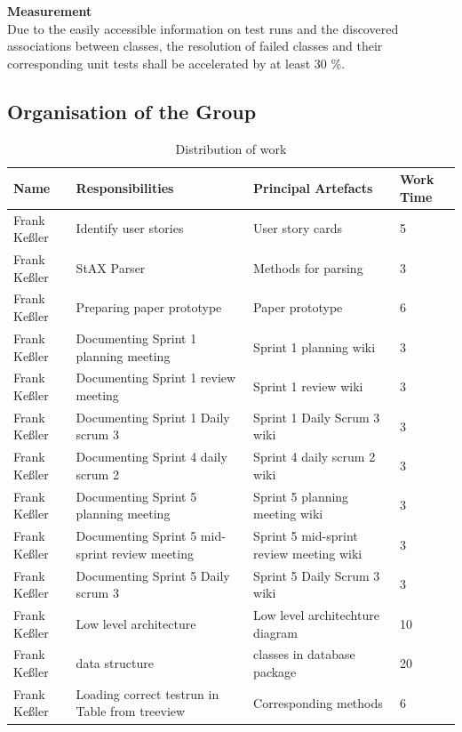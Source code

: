{\large\textbf{Measurement}}\\ 
Due to the easily accessible information on test runs and the discovered associations between classes, the resolution of failed classes and their corresponding unit tests shall be accelerated by at least 30 \%. 

\newpage
\subsection{Organisation of the Group}
\begin{table}[!h]
  \caption{Distribution of work}
  \centering
  \begin{tabular}{p{2cm}||p{4.2cm}|p{4cm}|l|}
    Name & Responsibilities & Principal Artefacts & Work Time\\
    \hline
    \hline
    Frank Keßler & Identify user stories & User story cards & 5 \\
    \hline
    Frank Keßler & StAX Parser & Methods for parsing & 3 \\ 
    \hline
    Frank Keßler & Preparing paper prototype & Paper prototype & 6 \\ 
    \hline
    Frank Keßler & Documenting Sprint 1 planning meeting & Sprint 1 planning wiki & 3 \\
    \hline
    Frank Keßler & Documenting Sprint 1 review meeting & Sprint 1 review wiki & 3 \\
	\hline
	Frank Keßler & Documenting Sprint 1 Daily scrum 3 & Sprint 1 Daily Scrum 3 wiki & 3 \\
	\hline
    Frank Keßler & Documenting Sprint 4 daily scrum 2 & Sprint 4 daily scrum 2 wiki & 3 \\
	\hline
	Frank Keßler & Documenting Sprint 5 planning meeting & Sprint 5 planning meeting wiki & 3 \\
	\hline
	Frank Keßler & Documenting Sprint 5 mid-sprint review meeting & Sprint 5 mid-sprint review meeting wiki & 3 \\
	\hline
	Frank Keßler & Documenting Sprint 5 Daily scrum 3 & Sprint 5 Daily Scrum 3 wiki & 3 \\
	\hline
    Frank Keßler & Low level architecture & Low level architechture diagram & 10 \\ 
    \hline
    Frank Keßler & data structure & classes in database package & 20 \\ 
    \hline 
    Frank Keßler & Loading correct testrun in Table from treeview & Corresponding methods & 6 \\ 

\end{tabular}
\end{table}
